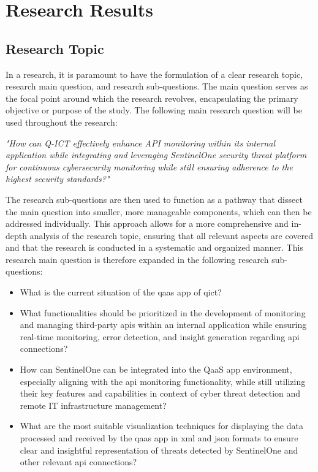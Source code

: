 \chapter{Research Results}
\begin{multicols}{2}
      \section{Research Topic}
      In a research, it is paramount to have the formulation of a clear research topic, research main question,
      and research sub-questions. The main question serves as the focal point around which the research revolves,
      encapsulating the primary objective or purpose of the study.
      The following main research question will be used throughout the research:
      \begin{center}
            \textit{"How can Q-ICT effectively enhance API monitoring within its internal application while
                  integrating and leveraging SentinelOne security threat platform for continuous cybersecurity
                  monitoring while still ensuring adherence to the highest security standards?"}
      \end{center}
      The research sub-questions are then used to function as a pathway that dissect the main
      question into smaller, more manageable components, which can then be addressed individually. This approach
      allows for a more comprehensive and in-depth analysis of the research topic, ensuring that all relevant
      aspects are covered and that the research is conducted in a systematic and organized manner.
      This research main question is therefore expanded in the following research sub-questions:
      \begin{itemize}
            \item What is the current situation of the \acrshort{qaas} app of \acrshort{qict}?
            \item What functionalities should be prioritized in the development of monitoring and managing
                  third-party \acrshort{api}s within an internal application while ensuring real-time monitoring,
                  error detection, and insight generation regarding \acrshort{api} connections?
            \item How can SentinelOne can be integrated into the QaaS app environment, especially aligning with the
                  \acrshort{api} monitoring functionality, while still utilizing their key features and capabilities in
                  context of cyber threat detection and remote IT infrastructure management?
            \item What are the most suitable visualization techniques for displaying the data processed and received by
                  the \acrshort{qaas} app in \acrshort{xml} and \acrshort{json} formats to ensure clear and
                  insightful representation of threats detected by SentinelOne and other relevant \acrshort{api}
                  connections?
      \end{itemize}

\end{multicols}
